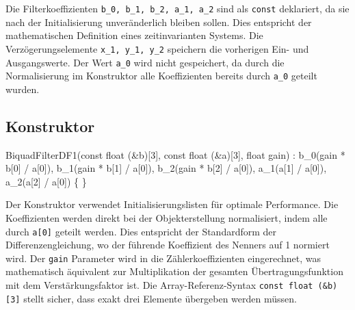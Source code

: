 \documentclass[
  ngerman,
  letterpaper,
  DIV=11]{scrreprt}
\newenvironment{Shaded}{\begin{snugshade}}{\end{snugshade}}
\newcommand{\AttributeTok}[1]{\textcolor[rgb]{0.40,0.45,0.13}{#1}}
\newcommand{\DataTypeTok}[1]{\textcolor[rgb]{0.68,0.00,0.00}{#1}}
\newcommand{\DecValTok}[1]{\textcolor[rgb]{0.68,0.00,0.00}{#1}}
\newcommand{\NormalTok}[1]{\textcolor[rgb]{0.00,0.23,0.31}{#1}}
\newcommand{\OperatorTok}[1]{\textcolor[rgb]{0.37,0.37,0.37}{#1}}
\begin{document}
Die Filterkoeffizienten \texttt{b\_0,\ b\_1,\ b\_2,\ a\_1,\ a\_2} sind
als \texttt{const} deklariert, da sie nach der Initialisierung
unveränderlich bleiben sollen. Dies entspricht der mathematischen
Definition eines zeitinvarianten Systems. Die Verzögerungselemente
\texttt{x\_1,\ y\_1,\ y\_2} speichern die vorherigen Ein- und
Ausgangswerte. Der Wert \texttt{a\_0} wird nicht gespeichert, da durch
die Normalisierung im Konstruktor alle Koeffizienten bereits durch
\texttt{a\_0} geteilt wurden.

\subsection{Konstruktor}\label{konstruktor}

\begin{Shaded}
\begin{Highlighting}[]
\NormalTok{BiquadFilterDF1}\OperatorTok{(}\AttributeTok{const} \DataTypeTok{float} \OperatorTok{(\&}\NormalTok{b}\OperatorTok{)[}\DecValTok{3}\OperatorTok{],} \AttributeTok{const} \DataTypeTok{float} \OperatorTok{(\&}\NormalTok{a}\OperatorTok{)[}\DecValTok{3}\OperatorTok{],} \DataTypeTok{float}\NormalTok{ gain}\OperatorTok{)}  
    \OperatorTok{:}\NormalTok{ b\_0}\OperatorTok{(}\NormalTok{gain }\OperatorTok{*}\NormalTok{ b}\OperatorTok{[}\DecValTok{0}\OperatorTok{]} \OperatorTok{/}\NormalTok{ a}\OperatorTok{[}\DecValTok{0}\OperatorTok{]),}
\NormalTok{      b\_1}\OperatorTok{(}\NormalTok{gain }\OperatorTok{*}\NormalTok{ b}\OperatorTok{[}\DecValTok{1}\OperatorTok{]} \OperatorTok{/}\NormalTok{ a}\OperatorTok{[}\DecValTok{0}\OperatorTok{]),}
\NormalTok{      b\_2}\OperatorTok{(}\NormalTok{gain }\OperatorTok{*}\NormalTok{ b}\OperatorTok{[}\DecValTok{2}\OperatorTok{]} \OperatorTok{/}\NormalTok{ a}\OperatorTok{[}\DecValTok{0}\OperatorTok{]),}
\NormalTok{      a\_1}\OperatorTok{(}\NormalTok{a}\OperatorTok{[}\DecValTok{1}\OperatorTok{]} \OperatorTok{/}\NormalTok{ a}\OperatorTok{[}\DecValTok{0}\OperatorTok{]),}
\NormalTok{      a\_2}\OperatorTok{(}\NormalTok{a}\OperatorTok{[}\DecValTok{2}\OperatorTok{]} \OperatorTok{/}\NormalTok{ a}\OperatorTok{[}\DecValTok{0}\OperatorTok{])} 
\OperatorTok{\{}
\OperatorTok{\}}
\end{Highlighting}
\end{Shaded}

Der Konstruktor verwendet Initialisierungslisten für optimale
Performance. Die Koeffizienten werden direkt bei der Objekterstellung
normalisiert, indem alle durch \texttt{a{[}0{]}} geteilt werden. Dies
entspricht der Standardform der Differenzengleichung, wo der führende
Koeffizient des Nenners auf 1 normiert wird. Der \texttt{gain} Parameter
wird in die Zählerkoeffizienten eingerechnet, was mathematisch
äquivalent zur Multiplikation der gesamten Übertragungsfunktion mit dem
Verstärkungsfaktor ist. Die Array-Referenz-Syntax
\texttt{const\ float\ (\&b){[}3{]}} stellt sicher, dass exakt drei
Elemente übergeben werden müssen.
\end{document}
